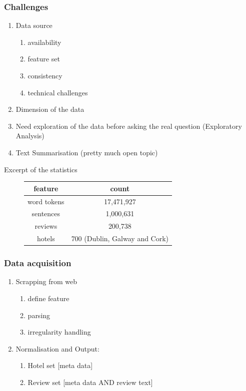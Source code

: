\documentclass[xetex,mathserif,serif]{beamer}
\begin{document}
\begin{frame}
	\frametitle{Challenges}
	\begin{enumerate}
		\item Data source 
		\begin{enumerate}
		\item availability
		\item feature set
		\item consistency
		\item technical challenges
		\end{enumerate}
		\item Dimension of the data
		\item Need exploration of the data before asking the real question (Exploratory Analysis)
		\item Text Summarisation (pretty much open topic)
	\end{enumerate}
	
	
	Excerpt of the statistics

\begin{figure}[h]
	\centering
	\fboxsep 2mm
	\begin{tabular}{c|c}
	feature & count \\
	\hline
		word tokens & 17,471,927 \\
		sentences & 1,000,631 \\
		reviews & 200,738 \\
		hotels & 700 (Dublin, Galway and Cork)
	\end{tabular}		
\end{figure}

	
\end{frame}

\begin{frame}
	\frametitle{Data acquisition}
	
\begin{enumerate}
		\item Scrapping from web
		\begin{enumerate}
		\item define feature
		\item parsing
		\item irregularity handling
	\end{enumerate} 
	\item Normalisation and Output:
	\begin{enumerate}
		\item Hotel set [meta data]
		\item Review set [meta data AND review text]
	\end{enumerate}
\end{enumerate}
\end{frame}
\end{document}
